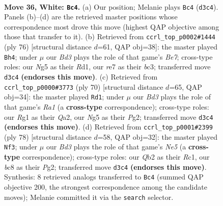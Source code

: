 \documentclass[11pt]{article}
\begin{document}
\clearpage

\begin{figure}[p]\centering
\begin{subfigure}{0.46\textwidth}\centering
\resizebox{\linewidth}{!}{%
\newchessgame
\chessboard[
  setfen={2b3k1/4rp1p/2q3p1/2n1PpN1/p4P2/3B4/PQP2KPP/6R1 w - - 8 36},
  showmover=false,
  pgfstyle=straightmove, color=movearrow, markmove={d3-c4}
]}
\caption{}
\end{subfigure}\hfill
\begin{subfigure}{0.46\textwidth}\centering
\resizebox{\linewidth}{!}{%
\newchessgame
\chessboard[
  setfen={r1n5/3qBp1k/2Np2pp/2pP4/1p2PP2/1PbQ3P/6PK/3R4 w - - 5 39},
  showmover=false,
  pgfstyle=straightmove, color=movearrow, markmove={e7-h4}
]}
\caption{}
\end{subfigure}
\\[4pt]
\begin{subfigure}{0.46\textwidth}\centering
\resizebox{\linewidth}{!}{%
\newchessgame
\chessboard[
  setfen={2k5/1pp2rpp/1p1pn3/3Nq3/1PP5/7P/Q4PP1/R5K1 w - - 2 36},
  showmover=false,
  pgfstyle=straightmove, color=movearrow, markmove={a1-d1}
]}
\caption{}
\end{subfigure}\hfill
\begin{subfigure}{0.46\textwidth}\centering
\resizebox{\linewidth}{!}{%
\newchessgame
\chessboard[
  setfen={8/r1p2pk1/1p1q2p1/1P1pNb2/3P3p/1Q2P2P/5PP1/2R4K w - - 6 40},
  showmover=false,
  pgfstyle=straightmove, color=movearrow, markmove={e5-f3}
]}
\caption{}
\end{subfigure}
\caption{\textbf{Move 36, White: \texttt{Bc4}.} (a) Our position; Melanie plays \texttt{Bc4} (\texttt{d3c4}). Panels (b)--(d) are the retrieved master positions whose correspondence most drove this move (highest QAP objective among those that transfer to it). (b) Retrieved from \texttt{ccrl\_top\_p0002\#1444} (ply 76) [structural distance $d$=61, QAP obj=38]: the master played \texttt{Bh4}; under $\mu$ our \emph{Bd3} plays the role of that game's \emph{Be7}; cross-type roles: our \emph{N}g5 as their \emph{R}d1, our \emph{r}e7 as their \emph{b}c3; transferred move \texttt{d3c4} \textbf{(endorses this move)}. (c) Retrieved from \texttt{ccrl\_top\_p0000\#3773} (ply 70) [structural distance $d$=65, QAP obj=34]: the master played \texttt{Rd1}; under $\mu$ our \emph{Bd3} plays the role of that game's \emph{Ra1} (a \textbf{cross-type} correspondence); cross-type roles: our \emph{R}g1 as their \emph{Q}a2, our \emph{N}g5 as their \emph{P}g2; transferred move \texttt{d3c4} \textbf{(endorses this move)}. (d) Retrieved from \texttt{ccrl\_top\_p0001\#2399} (ply 78) [structural distance $d$=58, QAP obj=32]: the master played \texttt{Nf3}; under $\mu$ our \emph{Bd3} plays the role of that game's \emph{Ne5} (a \textbf{cross-type} correspondence); cross-type roles: our \emph{Q}b2 as their \emph{R}c1, our \emph{b}c8 as their \emph{P}g2; transferred move \texttt{d3c4} \textbf{(endorses this move)}. Synthesis: 8 retrieved analogs transferred to \texttt{Bc4} (summed QAP objective 200, the strongest correspondence among the candidate moves); Melanie committed it via the \texttt{search} selector.}
\label{fig:thought-m70}
\end{figure}
\end{document}

